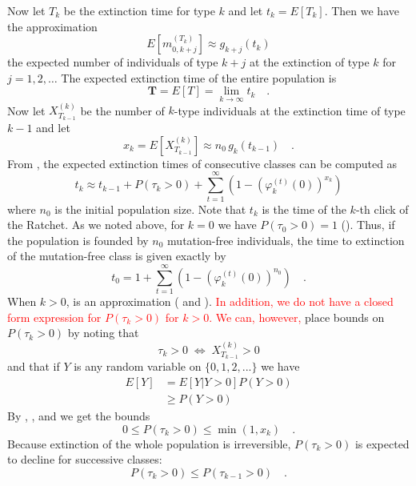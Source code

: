 \documentclass[9pt,lineno]{elife}
\newcommand{\red}{\textcolor{red}}
\begin{document}
Now let $T_{k}$ be the extinction time for type $k$ and let $t_{k}=E[T_{k}]$. Then we have the approximation
%
\begin{equation}
E\left[m_{0,k+j}^{(T_{k})}\right]\approx g_{k+j}(t_{k})
\label{eq:approx}
\end{equation}
%
the expected number of individuals of type $k+j$ at the extinction of type $k$ for $j=1,2,\ldots$ The expected extinction time of the entire population is
%
\begin{equation}
%
\mathbf{T} = E[T] = \lim_{k\rightarrow\infty}t_{k} \quad .
%
\label{eq:T}
\end{equation}
%
Now let $X_{T_{k-1}}^{(k)}$ 
be the number of $k$-type individuals at the extinction time of type $k-1$ and let 
%
\begin{equation}
%
x_{k} = E\left[X_{T_{k-1}}^{(k)}\right] \approx n_{0} \, g_{k}(t_{k-1}) \quad .
%
\label{eq:xk}
\end{equation}
%
From , the expected extinction times of consecutive classes can be computed as 
%
\begin{equation}
%
t_{k}\approx t_{k-1}+P(\tau_{k}>0)+\sum_{t=1}^{\infty}\left(1-\left(\varphi_{k}^{(t)}(0)\right)^{x_{k}}\right)
%
\label{eq:tk}
\end{equation}
%
where $n_0$ is the initial population size.  
Note that $t_k$ is the time of the $k$-th click of the Ratchet.
As we noted above, for $k=0$ we have $P(\tau_{0}>0)=1$ 
().  Thus, if the population is founded by $n_0$ mutation-free individuals, the time to extinction of the mutation-free class is given exactly by
%
\begin{equation}
t_{0} = 1+\sum_{t=1}^{\infty}\left(1-\left(\varphi_{k}^{(t)}(0)\right)^{n_{0}}\right) \quad .
\label{eq:t0}
\end{equation}
%
When $k>0$,  is an approximation ( and ).
\red{In addition, we do not have a closed form expression for $P(\tau_{k}>0)$ for $k>0$.
We can, however,} place bounds on $P(\tau_{k}>0)$ by noting that
%
\begin{equation}
\tau_{k} > 0 \; \Leftrightarrow \; X_{T_{k-1}}^{(k)} > 0
\label{eq:tauk2}
\end{equation}
%
and that if $Y$ is any random variable on $\{0, 1, 2, ...\}$ we have
%
\begin{align}
%
E[Y]  & =   E\left[Y|Y>0\right] P(Y>0)\nonumber\\
      & \geq  P(Y>0)
%
\label{eq:exp}
\end{align}
%
By , , and  we get the bounds 
%
\begin{equation}
%
0 \leq P(\tau_{k} > 0) \leq \min(1,x_{k}) \quad .
\label{eq:bounds}
%
\end{equation}
Because extinction of the whole population is irreversible, $P(\tau_{k} > 0)$ is expected to decline for successive classes:
\begin{equation*}
P(\tau_k>0) \leq P(\tau_{k-1}>0) \quad .
\end{equation*}
\end{document}
